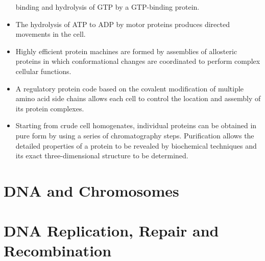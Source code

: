 \begin{itemize}
binding and hydrolysis of GTP by a GTP-binding protein.
\item The hydrolysis of ATP to ADP by motor proteins produces directed
movements in the cell.
\item Highly efficient protein machines are formed by assemblies of allosteric 
proteins in which conformational changes are coordinated to
perform complex cellular functions.
\item A regulatory protein code based on the covalent modification of multiple 
amino acid side chains allows each cell to control the location
and assembly of its protein complexes.
\item Starting from crude cell homogenates, individual proteins can be
obtained in pure form by using a series of chromatography steps.
Purification allows the detailed properties of a protein to be revealed
by biochemical techniques and its exact three-dimensional structure
to be determined.
\end{itemize}

\chapter{DNA and Chromosomes}


\chapter{DNA Replication, Repair and Recombination}